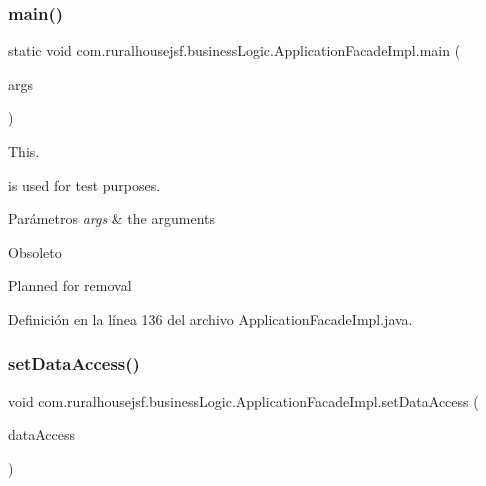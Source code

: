 \subsubsection{\texorpdfstring{main()}{main()}}
{\footnotesize\ttfamily static void com.\+ruralhousejsf.\+business\+Logic.\+Application\+Facade\+Impl.\+main (\begin{DoxyParamCaption}\item[{String \mbox{[}$\,$\mbox{]}}]{args }\end{DoxyParamCaption})\hspace{0.3cm}{\ttfamily [static]}}



This. 


\begin{DoxyCode}{0}
\end{DoxyCode}
 is used for test purposes.


\begin{DoxyParams}{Parámetros}
{\em args} & the arguments\\
\hline
\end{DoxyParams}
\begin{DoxyRefDesc}{Obsoleto}
\item[\mbox{\hyperlink{a00107__deprecated000001}{Obsoleto}}]Planned for removal \end{DoxyRefDesc}


Definición en la línea 136 del archivo Application\+Facade\+Impl.\+java.

\mbox{\label{a00132_a78fc6968b9fec7aa475b322463b6bd92}} 
\subsubsection{\texorpdfstring{setDataAccess()}{setDataAccess()}}
{\footnotesize\ttfamily void com.\+ruralhousejsf.\+business\+Logic.\+Application\+Facade\+Impl.\+set\+Data\+Access (\begin{DoxyParamCaption}\item[{\mbox{\hyperlink{a00148}{Hibernate\+Data\+Access\+Interface}}}]{data\+Access }\end{DoxyParamCaption})}



